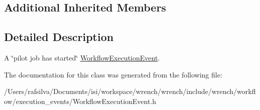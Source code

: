 \subsection*{Additional Inherited Members}


\subsection{Detailed Description}
A \char`\"{}pilot job has started\char`\"{} \hyperlink{classwrench_1_1_workflow_execution_event}{Workflow\+Execution\+Event}. 

The documentation for this class was generated from the following file\+:\begin{DoxyCompactItemize}
\item 
/\+Users/rafsilva/\+Documents/isi/workspace/wrench/wrench/include/wrench/workflow/execution\+\_\+events/Workflow\+Execution\+Event.\+h\end{DoxyCompactItemize}
